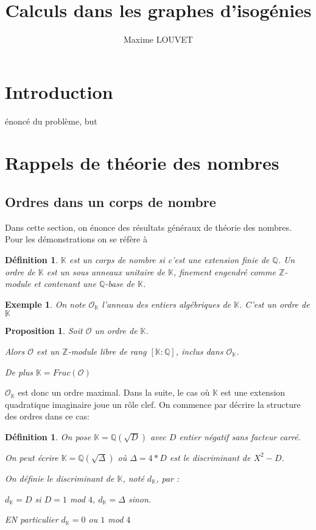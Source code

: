 \documentclass{article}
\title{Calculs dans les graphes d'isogénies}
\author{Maxime LOUVET}
\newcommand{\Z}[0]{\mathbb{Z}}
\newcommand{\Q}[0]{\mathbb{Q}}
\newcommand{\K}[0]{\mathbb{K}}
\newcommand{\OR}[0]{\mathcal{O}}
\newtheorem{Prop}[The]{Proposition}
\newtheorem{Def}[The]{Définition}
\newtheorem{Ex}[The]{Exemple}
\begin{document}
\maketitle
\tableofcontents

\section{Introduction}
énoncé du problème, but

\section{Rappels de théorie des nombres}

\subsection{Ordres dans un corps de nombre}

Dans cette section, on énonce des résultats généraux de théorie des nombres. Pour les démonstrations on se réfère à 


\begin{Def}
	 $\K$ est un corps de nombre si c'est une extension finie de $\Q$. Un ordre de $\K$ est un sous anneaux unitaire de $\K$, finement engendré comme $\Z$-module et contenant une $\Q$-base de $\K$.
\end{Def}

\begin{Ex}
	On note $\OR_{\K}$ l'anneau des entiers algébriques de $\K$. C'est un ordre de $\K$
\end{Ex}

\begin{Prop}
	Soit $\OR$ un ordre de $\K$. 
	
	Alors $\OR$ est un $\Z$-module libre de rang $\left[ \K : \Q\right] $, inclus dans $\OR_{\K}$.
	
	De plus $\K = Frac(\OR)$
\end{Prop}

$\OR_{\K}$ est donc un ordre maximal. Dans la suite, le cas où $\K$ est une extension quadratique imaginaire joue un rôle clef. On commence par décrire la structure des ordres dans ce cas:

\begin{Def}
	On pose $\K = \Q(\sqrt{D})$ avec $D$ entier négatif sans facteur carré. 
	
	On peut écrire $\K = \Q(\sqrt{\Delta})$ où $\Delta = 4*D$ est le discriminant de $X^{2} - D$. 
	
	On définie le discriminant de $\K$, noté $d_{\K}$, par :
	
	$d_{\K} = D$ si $D = 1$ mod $4$, $d_{\K} = \Delta$ sinon.
	
	EN particulier $d_{\K} = 0$ ou $1$ mod $4$
	
\end{Def}
\end{document}

